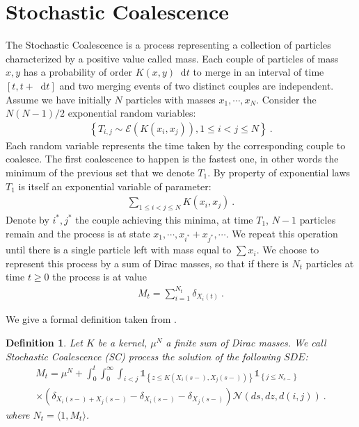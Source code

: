 \documentclass[11pt,a4paper]{article}
\newcommand{\SC}{{\emph{SC}}}
\newcommand{\indic}[1]{\mathds{1}_{\left\lbrace#1\right\rbrace}}
\newcommand{\dd}{\mathop{}\!\mathrm{d}}
\newtheorem{definition}[theorem]{Definition}
\begin{document}
\section{Stochastic Coalescence}
The Stochastic Coalescence is a process representing a collection of particles characterized by a positive value called mass. Each couple of particles of mass $x,y$ has a probability of order $K(x,y)\dd t$ to merge in an interval of time $[t, t + \dd t]$ and two merging events of two distinct couples are independent. Assume we have initially $N$ particles with masses $x_{1},\cdots,x_{N}$. Consider the $N(N-1)/2$ exponential random variables:
\begin{align*}
    \left\lbrace T_{i,j} \sim \mathcal{E}\left(K(x_{i},x_{j})\right), 1 \leq i < j \leq N \right\rbrace\ .
\end{align*}
Each random variable represents the time taken by the corresponding couple to coalesce. The first coalescence to happen is the fastest one, in other words the minimum of the previous set that we denote $T_1$. By property of exponential laws $T_1$ is itself an exponential variable of parameter:
\begin{align*}
    \sum\limits_{1 \leq i < j \leq N}K(x_{i},x_{j})\ .
\end{align*}
Denote by $i^*,j^*$ the couple achieving this minima, at time $T_1$, $N-1$ particles remain and the process is at state $x_{1},\cdots , x_{i^*}+x_{j^*},\cdots$. We repeat this operation until there is a single particle left with mass equal to $\sum\limits x_i$. We choose to represent this process by a sum of Dirac masses, so that if there is $N_t$ particles at time $t\geq 0$ the process is at value
\begin{align*}
    M_t = \sum\limits_{i = 1}^{N_t} \delta_{X_{i}(t)}\ .
\end{align*}

We give a formal definition taken from \cite{fournier2006some,fournier2009stochastic}.
\begin{definition}
    Let $K$ be a kernel, $\mu^N$ a finite sum of Dirac masses. We call Stochastic Coalescence (\SC) process the solution of the following $SDE$:
    \begin{multline*}
        M_t = \mu^N + \int_0^t \int_0^\infty \int_{i <j }  \indic{z \leq K(X_{i}(s-),X_{j}(s-))} \indic{j \leq N_{s-}} \\ \times \left(\delta_{X_{i}(s-) + X_{j}(s-)} - \delta_{X_{i}(s-)} - \delta_{X_{j}(s-)}\right)\mathcal{N}(ds,dz,d(i,j))\ .
    \end{multline*}
    where $N_t = \langle 1 , M_t\rangle$.
\end{definition}
\end{document}
